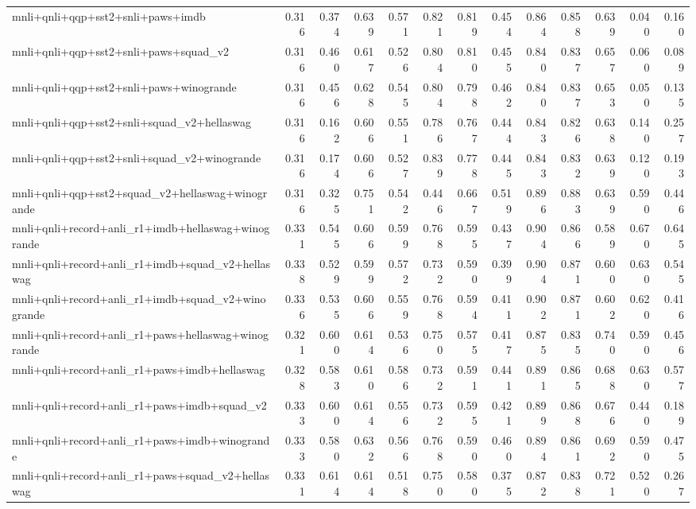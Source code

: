\begin{table}[t]
\begin{tabular}{lrrrrrrrrrrrr}
    mnli+qnli+qqp+sst2+snli+paws+imdb & 0.316 & 0.374 & 0.639 & 0.571 & 0.821 & 0.819 & 0.454 & 0.864 & 0.858 & 0.639 & 0.040 & 0.160 \\
    mnli+qnli+qqp+sst2+snli+paws+squad\_v2 & 0.316 & 0.460 & 0.617 & 0.526 & 0.804 & 0.810 & 0.455 & 0.840 & 0.837 & 0.657 & 0.060 & 0.089 \\
    mnli+qnli+qqp+sst2+snli+paws+winogrande & 0.316 & 0.456 & 0.628 & 0.545 & 0.804 & 0.798 & 0.462 & 0.840 & 0.837 & 0.653 & 0.050 & 0.135 \\
    mnli+qnli+qqp+sst2+snli+squad\_v2+hellaswag & 0.316 & 0.162 & 0.606 & 0.551 & 0.786 & 0.767 & 0.444 & 0.843 & 0.826 & 0.638 & 0.140 & 0.257 \\
    mnli+qnli+qqp+sst2+snli+squad\_v2+winogrande & 0.316 & 0.174 & 0.606 & 0.527 & 0.839 & 0.778 & 0.445 & 0.843 & 0.832 & 0.639 & 0.120 & 0.193 \\
    mnli+qnli+qqp+sst2+squad\_v2+hellaswag+winogrande & 0.316 & 0.325 & 0.751 & 0.542 & 0.446 & 0.667 & 0.519 & 0.896 & 0.883 & 0.639 & 0.590 & 0.446 \\
    mnli+qnli+record+anli\_r1+imdb+hellaswag+winogrande & 0.331 & 0.545 & 0.606 & 0.599 & 0.768 & 0.595 & 0.437 & 0.904 & 0.866 & 0.589 & 0.670 & 0.645 \\
    mnli+qnli+record+anli\_r1+imdb+squad\_v2+hellaswag & 0.338 & 0.529 & 0.599 & 0.572 & 0.732 & 0.590 & 0.399 & 0.904 & 0.871 & 0.600 & 0.630 & 0.545 \\
    mnli+qnli+record+anli\_r1+imdb+squad\_v2+winogrande & 0.336 & 0.535 & 0.606 & 0.559 & 0.768 & 0.594 & 0.411 & 0.902 & 0.871 & 0.602 & 0.620 & 0.416 \\
    mnli+qnli+record+anli\_r1+paws+hellaswag+winogrande & 0.321 & 0.600 & 0.614 & 0.536 & 0.750 & 0.575 & 0.417 & 0.875 & 0.835 & 0.740 & 0.590 & 0.456 \\
    mnli+qnli+record+anli\_r1+paws+imdb+hellaswag & 0.328 & 0.583 & 0.610 & 0.586 & 0.732 & 0.591 & 0.441 & 0.891 & 0.865 & 0.688 & 0.630 & 0.577 \\
    mnli+qnli+record+anli\_r1+paws+imdb+squad\_v2 & 0.333 & 0.600 & 0.614 & 0.556 & 0.732 & 0.595 & 0.421 & 0.899 & 0.868 & 0.676 & 0.440 & 0.189 \\
    mnli+qnli+record+anli\_r1+paws+imdb+winogrande & 0.333 & 0.580 & 0.632 & 0.566 & 0.768 & 0.590 & 0.460 & 0.894 & 0.861 & 0.692 & 0.590 & 0.475 \\
    mnli+qnli+record+anli\_r1+paws+squad\_v2+hellaswag & 0.331 & 0.614 & 0.614 & 0.518 & 0.750 & 0.580 & 0.375 & 0.872 & 0.838 & 0.721 & 0.520 & 0.267 \\

\end{tabular}
\end{table}
